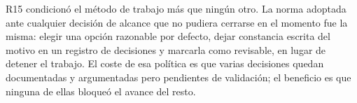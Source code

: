 R15 condicionó el método de trabajo más que ningún otro. La norma adoptada ante cualquier
decisión de alcance que no pudiera cerrarse en el momento fue la misma: elegir una opción
razonable por defecto, dejar constancia escrita del motivo en un registro de decisiones y
marcarla como revisable, en lugar de detener el trabajo. El coste de esa política es que
varias decisiones quedan documentadas y argumentadas pero pendientes de validación; el
beneficio es que ninguna de ellas bloqueó el avance del resto.

